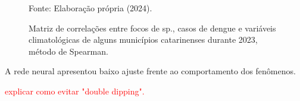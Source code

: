 \documentclass[
	12pt,				%
	openright,			%
	oneside,			%
	a4paper,			%
	english,			%
	french,				%
	spanish,			%
	brazil				%
	dvipsnames, table]{abntex2}
\begin{document}
\begin{figure}[htbp]
    \centering
    \caption{Matriz de correlações entre focos de  sp., casos de dengue e variáveis climatológicas de alguns municípios catarinenses durante 2023, método de Spearman.}
    \label{fig: matriz_corr_CLI}
    \hfill
    \hfill
    \small{Fonte: Elaboração própria (2024).}
\end{figure}

\indent 










\indent A rede neural apresentou baixo ajuste frente ao comportamento dos fenômenos.

\indent \textcolor{red}{explicar como evitar "double dipping".}
\end{document}
